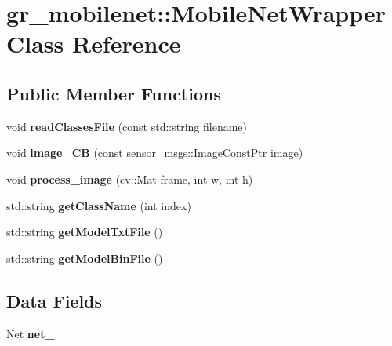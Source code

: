 \hypertarget{classgr__mobilenet_1_1MobileNetWrapper}{}\section{gr\+\_\+mobilenet\+:\+:Mobile\+Net\+Wrapper Class Reference}
\label{classgr__mobilenet_1_1MobileNetWrapper}
\subsection*{Public Member Functions}
\begin{DoxyCompactItemize}
\item 
\mbox{\label{classgr__mobilenet_1_1MobileNetWrapper_a81d508f93388654c3a3404ec4e17f99a}} 
void {\bfseries read\+Classes\+File} (const std\+::string filename)
\item 
\mbox{\label{classgr__mobilenet_1_1MobileNetWrapper_a0fa597a10543d2e44a84984feeb07796}} 
void {\bfseries image\+\_\+\+CB} (const sensor\+\_\+msgs\+::\+Image\+Const\+Ptr image)
\item 
\mbox{\label{classgr__mobilenet_1_1MobileNetWrapper_aa70cadd7fa3f9122ee302ef3a78e6a4f}} 
void {\bfseries process\+\_\+image} (cv\+::\+Mat frame, int w, int h)
\item 
\mbox{\label{classgr__mobilenet_1_1MobileNetWrapper_a49b2632ef6d173b551649bb1f463e13f}} 
std\+::string {\bfseries get\+Class\+Name} (int index)
\item 
\mbox{\label{classgr__mobilenet_1_1MobileNetWrapper_a9f577b0e09371e272385b9715dedd0ed}} 
std\+::string {\bfseries get\+Model\+Txt\+File} ()
\item 
\mbox{\label{classgr__mobilenet_1_1MobileNetWrapper_a593d12abbd805b75a9846e53efa1e473}} 
std\+::string {\bfseries get\+Model\+Bin\+File} ()
\end{DoxyCompactItemize}
\subsection*{Data Fields}
\begin{DoxyCompactItemize}
\item 
\mbox{\label{classgr__mobilenet_1_1MobileNetWrapper_a68def41fd3ee140c1e7ae334105630c8}} 
Net {\bfseries net\+\_\+}
\end{DoxyCompactItemize}


